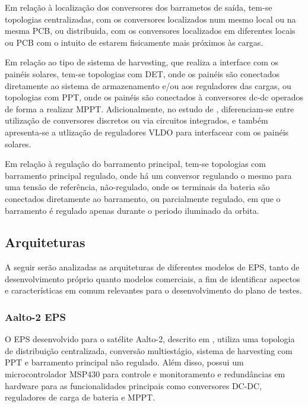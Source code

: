 Em relação à localização dos conversores dos barrametos de saída, tem-se topologias centralizadas, com os conversores localizados num mesmo local ou na mesma PCB, ou distribuida, com os conversores localizados em diferentes locais ou PCB com o intuito de estarem fisicamente mais próximos às cargas.

Em relação ao tipo de sistema de harvesting, que realiza a interface com os painéis solares, tem-se topologias com \gls{DET}, onde os painéis são conectados diretamente ao sistema de armazenamento e/ou aos reguladores das cargas, ou topologias com \gls{PPT}, onde os painéis são conectados à conversores dc-dc operados de forma a realizar \gls{MPPT}.
Adicionalmente, no estudo de \textcite{sara-review-eps}, diferenciam-se entre utilização de conversores discretos ou via circuitos integrados, e também apresenta-se a utlização de reguladores VLDO para interfacear com os painéis solares.

Em relação à regulação do barramento principal, tem-se topologias com barramento principal regulado, onde há um conversor regulando o mesmo para uma tensão de referência, não-regulado, onde os terminais da bateria são conectados diretamente ao barramento, ou parcialmente regulado, em que o barramento é regulado apenas durante o periodo iluminado da orbita.



\subsection{Arquiteturas}\label{sec:arquiteturas}

A seguir serão analizadas as arquiteturas de diferentes modelos de \gls{EPS}, tanto de desenvolvimento próprio quanto modelos comerciais, a fim de identificar aspectos e características em comum relevantes para o desenvolvimento do plano de testes.

\subsubsection{Aalto-2 EPS}

O \gls{EPS} desenvolvido para o satélite Aalto-2, descrito em \textcite{aalto-eps}, utiliza uma topologia de distribuição centralizada, conversão multiestágio, sistema de harvesting com \gls{PPT} e barramento principal não regulado.
Além disso, possui um microcontrolador MSP430 para controle e monitoramento e redundâncias em hardware para as funcionalidades principais como conversores DC-DC, reguladores de carga de bateria e \gls{MPPT}.

